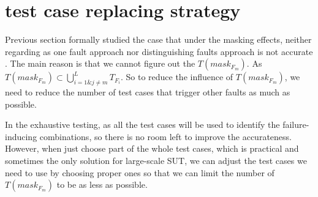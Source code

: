 \documentclass{sig-alternate}
\begin{document}
%
%
%
%
%


\section{test case replacing strategy}
Previous section formally studied the case that under the masking effects, neither regarding as one fault approach nor distinguishing faults approach is not accurate . The main reason is that we cannot figure out the $T(mask_{F_{m}})$.  As $T(mask_{F_{m}}) \subset \bigcup_{i = 1 \& j \neq m }^{L}T_{F_{i}}$. So to reduce the influence of $T(mask_{F_{m}})$, we need to reduce the number of test cases that trigger other faults as much as possible.

In the exhaustive testing, as all the test cases will be used to identify the failure-inducing combinations, so there is no room left to improve the accurateness. However, when just choose part of the whole test cases, which is practical and sometimes the only solution for large-scale SUT, we can adjust the test cases we need to use by choosing proper ones so that we can limit the number of $T(mask_{F_{m}})$ to  be as less as possible.
\end{document}
